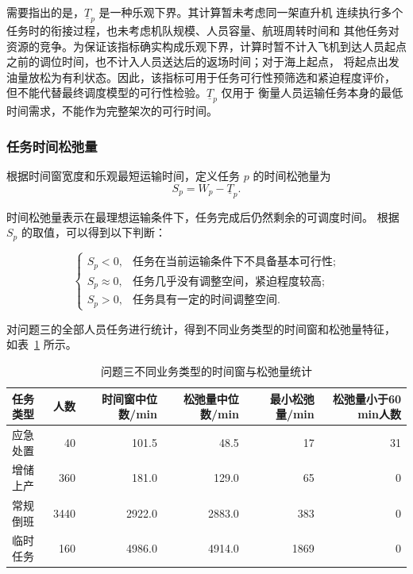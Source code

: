 \documentclass[UTF8,a4paper,zihao=5]{ctexart}
\begin{document}
需要指出的是，$\underline{T}_p$ 是一种乐观下界。其计算暂未考虑同一架直升机
连续执行多个任务时的衔接过程，也未考虑机队规模、人员容量、航班周转时间和
其他任务对资源的竞争。为保证该指标确实构成乐观下界，计算时暂不计入飞机到达人员起点
之前的调位时间，也不计入人员送达后的返场时间；对于海上起点，
将起点出发油量放松为有利状态。因此，该指标可用于任务可行性预筛选和紧迫程度评价，
但不能代替最终调度模型的可行性检验。$\underline{T}_p$ 仅用于
衡量人员运输任务本身的最低时间需求，不能作为完整架次的可行时间。
\subsubsection{任务时间松弛量}

根据时间窗宽度和乐观最短运输时间，定义任务 $p$ 的时间松弛量为
\begin{equation}
    S_p=W_p-\underline{T}_p.
    \label{eq:q3_slack}
\end{equation}

时间松弛量表示在最理想运输条件下，任务完成后仍然剩余的可调度时间。
根据 $S_p$ 的取值，可以得到以下判断：

\begin{equation}
    \begin{cases}
        S_p<0, & \text{任务在当前运输条件下不具备基本可行性};\\
        S_p\approx 0, & \text{任务几乎没有调整空间，紧迫程度较高};\\
        S_p>0, & \text{任务具有一定的时间调整空间}.
    \end{cases}
\end{equation}

对问题三的全部人员任务进行统计，得到不同业务类型的时间窗和松弛量特征，
如表~\ref{tab:q3_time_window_summary} 所示。

\begin{table}[htbp]
    \centering
    \small
    \caption{问题三不同业务类型的时间窗与松弛量统计}
    \label{tab:q3_time_window_summary}
    \begin{tabular}{lrrrrr}
        \toprule
        任务类型
        & 人数
        & 时间窗中位数/min
        & 松弛量中位数/min
        & 最小松弛量/min
        & 松弛量小于60 min人数 \\
        \midrule
        应急处置 & 40   & 101.5 & 48.5  & 17   & 31 \\
        增储上产 & 360  & 181.0 & 129.0 & 65   & 0  \\
        常规倒班 & 3440 & 2922.0& 2883.0& 383  & 0  \\
        临时任务 & 160  & 4986.0& 4914.0& 1869 & 0  \\
        \bottomrule
    \end{tabular}
\end{table}
\end{document}
